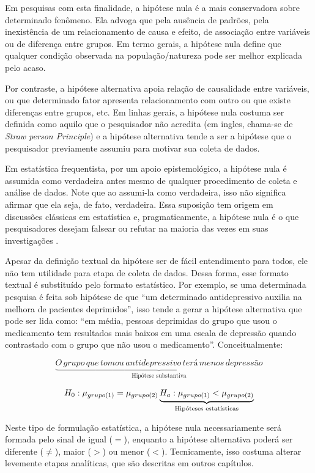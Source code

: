 \documentclass[
]{book}
\begin{document}
Em pesquisas com esta finalidade, a hipótese nula é a mais conservadora sobre determinado fenômeno. Ela advoga que pela ausência de padrões, pela inexistência de um relacionamento de causa e efeito, de associação entre variáveis ou de diferença entre grupos. Em termo gerais, a hipótese nula define que qualquer condição observada na população/natureza pode ser melhor explicada pelo acaso.

Por contraste, a hipótese alternativa apoia relação de causalidade entre variáveis, ou que determinado fator apresenta relacionamento com outro ou que existe diferenças entre grupos, etc. Em linhas gerais, a hipótese nula costuma ser definida como aquilo que o pesquisador não acredita (em ingles, chama-se de \emph{Straw person Principle}) e a hipótese alternativa tende a ser a hipótese que o pesquisador previamente assumiu para motivar sua coleta de dados.

Em estatística frequentista, por um apoio epistemológico, a hipótese nula é assumida como verdadeira antes mesmo de qualquer procedimento de coleta e análise de dados. Note que ao assumi-la como verdadeira, isso não significa afirmar que ela seja, de fato, verdadeira. Essa suposição tem origem em discussões clássicas em estatística e, pragmaticamente, a hipótese nula é o que pesquisadores desejam falsear ou refutar na maioria das vezes em suas investigações \citep{Lecoutre2014}.

Apesar da definição textual da hipótese ser de fácil entendimento para todos, ele não tem utilidade para etapa de coleta de dados. Dessa forma, esse formato textual é substituído pelo formato estatístico. Por exemplo, se uma determinada pesquisa é feita sob hipótese de que ``um determinado antidepressivo auxilia na melhora de pacientes deprimidos'', isso tende a gerar a hipótese alternativa que pode ser lida como: ``em média, pessoas deprimidas do grupo que usou o medicamento tem resultados mais baixos em uma escala de depressão quando contrastado com o grupo que não usou o medicamento''. Conceitualmente:

\[\underbrace{O \,grupo \,que \,tomou \,antidepressivo \,terá \,menos \,depressão}_\text{Hipótese  substantiva}\]

\[H_0: \mu_{grupo (1)} = \mu_{grupo (2)} \\ \underbrace{H_a: \mu_{grupo (1)} < \mu_{grupo (2)}}_\text{Hipóteses estatísticas}\]

Neste tipo de formulação estatística, a hipótese nula necessariamente será formada pelo sinal de igual (\(=\)), enquanto a hipótese alternativa poderá ser diferente (\(\neq\)), maior (\(>\)) ou menor (\(<\)). Tecnicamente, isso costuma alterar levemente etapas analíticas, que são descritas em outros capítulos.
\end{document}
